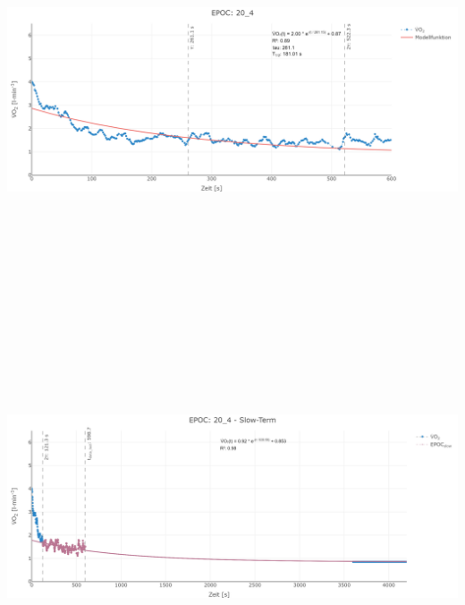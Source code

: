 \documentclass[
  letterpaper,
  DIV=11]{scrartcl}
\begin{document}
\includegraphics[width=11.45833in,height=4.6875in]{images/20_4_tau.png}
\includegraphics[width=11.45833in,height=4.6875in]{images/20_4_slow.png}
\end{document}
